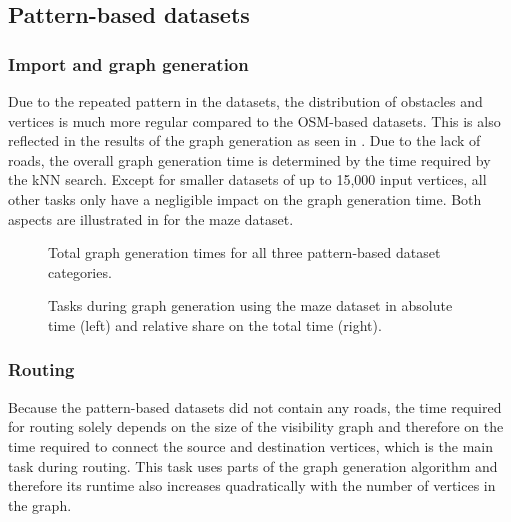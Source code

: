 	\subsection{Pattern-based datasets}
	
		\subsubsection{Import and graph generation}
		
			Due to the repeated pattern in the datasets, the distribution of obstacles and vertices is much more regular compared to the OSM-based datasets.
			This is also reflected in the results of the graph generation as seen in .
			Due to the lack of roads, the overall graph generation time is determined by the time required by the kNN search.
			Except for smaller datasets of up to 15,000 input vertices, all other tasks only have a negligible impact on the graph generation time.
			Both aspects are illustrated in  for the maze dataset.
			
			\begin{figure}[h!]
				\begin{figcenter}
					
				\end{figcenter}
				\caption{Total graph generation times for all three pattern-based dataset categories.}
				\label{fig:eval-import-pattern-abs}
			\end{figure}
			
			\begin{figure}[h!]
				\begin{figcenter}
					
				\end{figcenter}
				\caption{Tasks during graph generation using the maze dataset in absolute time (left) and relative share on the total time (right).}
				\label{fig:eval-import-pattern-maze-abs-rel}
			\end{figure}
		
		\subsubsection{Routing}
		
			Because the pattern-based datasets did not contain any roads, the time required for routing solely depends on the size of the visibility graph and therefore on the time required to connect the source and destination vertices, which is the main task during routing.
			This task uses parts of the graph generation algorithm and therefore its runtime also increases quadratically with the number of vertices in the graph.
			
